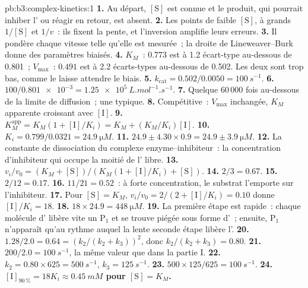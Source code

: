 \begin{solution}{pb:b3:complex-kinetics:1}
\textbf{1.} Au départ, $[\mathrm S]$ est connue et le produit, qui
pourrait inhiber l' ou réagir en retour, est absent.
\textbf{2.} Les points de faible $[\mathrm S]$, à grands $1/[\mathrm S]$ et
$1/v$~: ils fixent la pente, et l'inversion amplifie leurs erreurs.
\textbf{3.} Il pondère chaque vitesse telle qu'elle est mesurée~; la
droite de Lineweaver--Burk donne des paramètres biaisés.
\textbf{4.} $K_M$~: $0.773$ est à 1.2 écart-type au-dessous de 0.801~;
$V_{\max}$~: $0.491$ est à 2.2 écarts-types au-dessous de 0.502. Les
deux sont trop bas, comme le laisse attendre le biais.
\textbf{5.} $k_{\mathrm{cat}} = 0.502/0.0050 = \qty{100}{s^{-1}}$.
\textbf{6.} $100/\num{0.801e-3} = \qty{1.25e5}{L.mol^{-1}.s^{-1}}$.
\textbf{7.} Quelque 60\,000 fois au-dessous de la limite de diffusion~;
une  typique.
\textbf{8.} Compétitive~: $V_{\max}$ inchangée, $K_M$ apparente croissant
avec $[\mathrm I]$.
\textbf{9.} $K_M^{\mathrm{app}} = K_M(1 + [\mathrm I]/K_i) = K_M + (K_M/K_i)[\mathrm I]$.
\textbf{10.} $K_i = 0.799/0.0321 = \qty{24.9}{\micro M}$.
\textbf{11.} $24.9 \pm 4.30 \times 0.9 = 24.9 \pm \qty{3.9}{\micro M}$.
\textbf{12.} La constante de dissociation du complexe enzyme--inhibiteur~:
la concentration d'inhibiteur qui occupe la moitié de l' libre.
\textbf{13.} $v_i/v_0 = (K_M + [\mathrm S])/(K_M(1 + [\mathrm I]/K_i) + [\mathrm S])$.
\textbf{14.} $2/3 = 0.67$.
\textbf{15.} $2/12 = 0.17$.
\textbf{16.} $11/21 = 0.52$~: à forte concentration, le substrat l'emporte
sur l'inhibiteur.
\textbf{17.} Pour $[\mathrm S] = K_M$, $v_i/v_0 = 2/(2 + [\mathrm I]/K_i) = 0.10$ donne $[\mathrm I]/K_i = 18$.
\textbf{18.} $18 \times 24.9 = \qty{448}{\micro M}$.
\textbf{19.} La première étape est rapide~: chaque molécule d'
libère vite un $\mathrm P_1$
et se trouve piégée sous forme d'~; ensuite, $\mathrm P_1$
n'apparaît qu'au rythme auquel la lente
seconde étape libère l'.
\textbf{20.} $1.28/2.0 = 0.64 = (k_2/(k_2 + k_3))^2$, donc $k_2/(k_2 + k_3) = 0.80$.
\textbf{21.} $200/2.0 = \qty{100}{s^{-1}}$, la même valeur que dans la
partie I.
\textbf{22.} $k_2 = 0.80 \times 625 = \qty{500}{s^{-1}}$, $k_3 = \qty{125}{s^{-1}}$.
\textbf{23.} $500 \times 125/625 = \qty{100}{s^{-1}}$.
\textbf{24.} \textbf{$[\mathrm I]_{90\,\%} = 18K_i \approx \qty{0.45}{mM}$
pour $[\mathrm S] = K_M$.}
\end{solution}
